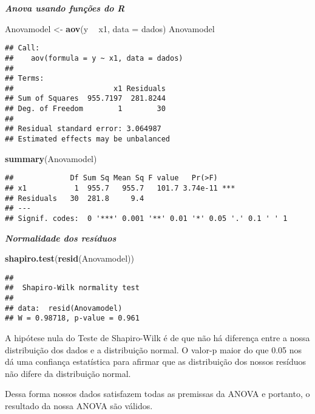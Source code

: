 \documentclass[
]{article}
\newenvironment{Shaded}{\begin{snugshade}}{\end{snugshade}}
\newcommand{\DataTypeTok}[1]{\textcolor[rgb]{0.13,0.29,0.53}{#1}}
\newcommand{\KeywordTok}[1]{\textcolor[rgb]{0.13,0.29,0.53}{\textbf{#1}}}
\newcommand{\NormalTok}[1]{#1}
\newcommand{\OperatorTok}[1]{\textcolor[rgb]{0.81,0.36,0.00}{\textbf{#1}}}
\newcommand{\StringTok}[1]{\textcolor[rgb]{0.31,0.60,0.02}{#1}}
\begin{document}
\textbf{\emph{Anova usando funções do R}}

\begin{Shaded}
\begin{Highlighting}[]
\NormalTok{Anovamodel <-}\StringTok{ }\KeywordTok{aov}\NormalTok{(y }\OperatorTok{~}\StringTok{ }\NormalTok{x1, }\DataTypeTok{data =}\NormalTok{ dados)}
\NormalTok{Anovamodel}
\end{Highlighting}
\end{Shaded}

\begin{verbatim}
## Call:
##    aov(formula = y ~ x1, data = dados)
## 
## Terms:
##                       x1 Residuals
## Sum of Squares  955.7197  281.8244
## Deg. of Freedom        1        30
## 
## Residual standard error: 3.064987
## Estimated effects may be unbalanced
\end{verbatim}

\begin{Shaded}
\begin{Highlighting}[]
\KeywordTok{summary}\NormalTok{(Anovamodel)}
\end{Highlighting}
\end{Shaded}

\begin{verbatim}
##             Df Sum Sq Mean Sq F value   Pr(>F)    
## x1           1  955.7   955.7   101.7 3.74e-11 ***
## Residuals   30  281.8     9.4                     
## ---
## Signif. codes:  0 '***' 0.001 '**' 0.01 '*' 0.05 '.' 0.1 ' ' 1
\end{verbatim}

\textbf{\emph{Normalidade dos resíduos}}

\begin{Shaded}
\begin{Highlighting}[]
\KeywordTok{shapiro.test}\NormalTok{(}\KeywordTok{resid}\NormalTok{(Anovamodel))}
\end{Highlighting}
\end{Shaded}

\begin{verbatim}
## 
##  Shapiro-Wilk normality test
## 
## data:  resid(Anovamodel)
## W = 0.98718, p-value = 0.961
\end{verbatim}

A hipótese nula do Teste de Shapiro-Wilk é de que não há diferença entre
a nossa distribuição dos dados e a distribuição normal. O valor-p maior
do que 0.05 nos dá uma confiança estatística para afirmar que as
distribuição dos nossos resíduos não difere da distribuição normal.

Dessa forma nossos dados satisfazem todas as premissas da ANOVA e
portanto, o resultado da nossa ANOVA são válidos.
\end{document}
